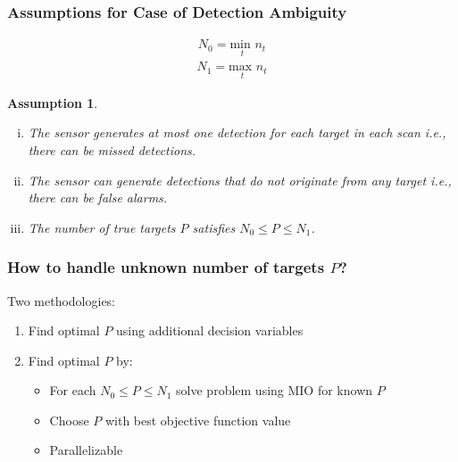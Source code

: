 \documentclass{beamer}
\newtheorem{assumption}{Assumption}
\begin{document}

\begin{frame}
\frametitle{Assumptions for Case of Detection Ambiguity}
\begin{align*}
N_{0} = \underset{t}{\text{min }} n_{t}
\end{align*}
\begin{align*}
N_{1} = \underset{t}{\text{max }}  n_{t}
\end{align*}
\begin{assumption}
\leavevmode
\begin{enumerate}[(i)]
\item The sensor generates at most one detection for each target in each scan i.e., there can be missed detections.
\item The sensor can generate detections that do not originate from any target i.e., there can be false alarms.
\item The number of true targets $P$ satisfies $N_0\leq P \leq N_1$.
\end{enumerate}
\end{assumption}
\end{frame}

\begin{frame}
\frametitle{How to handle unknown number of targets $P$?}
Two methodologies:
\begin{enumerate}
\item Find optimal $P$ using additional decision variables
\item Find optimal $P$ by:
\begin{itemize}
\item For each $N_0\leq P\leq N_1$ solve problem using MIO for known $P$
\item Choose $P$ with best objective function value
\item Parallelizable 
\end{itemize}
\end{enumerate}
\end{frame}
\end{document}
